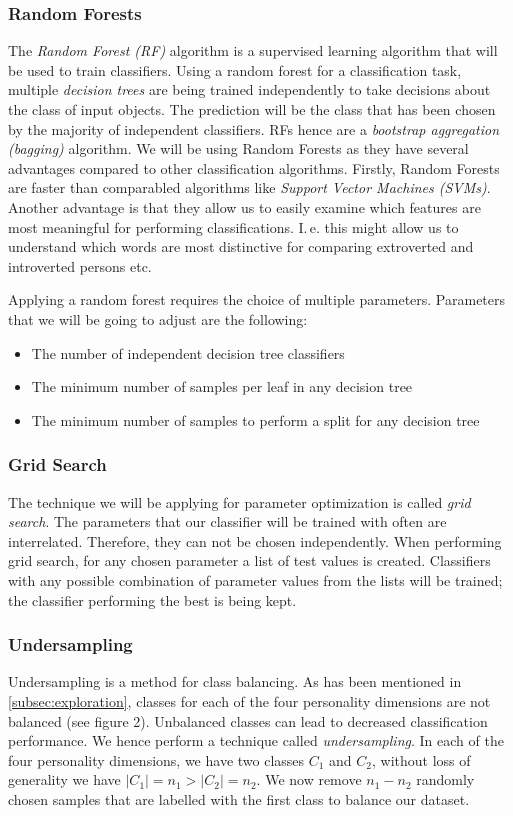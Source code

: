 \documentclass[12pt]{elsarticle}
\begin{document}
\subsubsection{Random Forests}
The \textit{Random Forest (RF)} algorithm is a supervised learning algorithm that will be used to train classifiers. Using a random forest for a classification task, multiple \textit{decision trees} are being trained independently to take decisions about the class of input objects. The prediction will be the class that has been chosen by the majority of independent classifiers. RFs hence are a \textit{bootstrap aggregation (bagging)} algorithm. We will be using Random Forests as they have several advantages compared to other classification algorithms. Firstly, Random Forests are faster than comparabled algorithms like \textit{Support Vector Machines (SVMs)}. Another advantage is that they allow us to easily examine which features are most meaningful for performing classifications. I.\,e. this might allow us to understand which words are most distinctive for comparing extroverted and introverted persons etc.

Applying a random forest requires the choice of multiple parameters. Parameters that we will be going to adjust are the following:
\begin{itemize}
\item The number of independent decision tree classifiers
\item The minimum number of samples per leaf in any decision tree
\item The minimum number of samples to perform a split for any decision tree
\end{itemize}

\subsubsection{Grid Search}
The technique we will be applying for parameter optimization is called \textit{grid search}. The parameters that our classifier will be trained with often are interrelated. Therefore, they can not be chosen independently. When performing grid search, for any chosen parameter a list of test values is created. Classifiers with any possible combination of parameter values from the lists will be trained; the classifier performing the best is being kept.


\subsubsection{Undersampling}
Undersampling is a method for class balancing. As has been mentioned in \ref{subsec:exploration}, classes for each of the four personality dimensions are not balanced (see figure 2). Unbalanced classes can lead to decreased classification performance. We hence perform a technique called \textit{undersampling}. In each of the four personality dimensions, we have two classes $C_1$ and $C_2$, without loss of generality we have $|C_1|=n_1>|C_2|=n_2$. We now remove $n_1-n_2$ randomly chosen samples that are labelled with the first class to balance our dataset.
\end{document}
